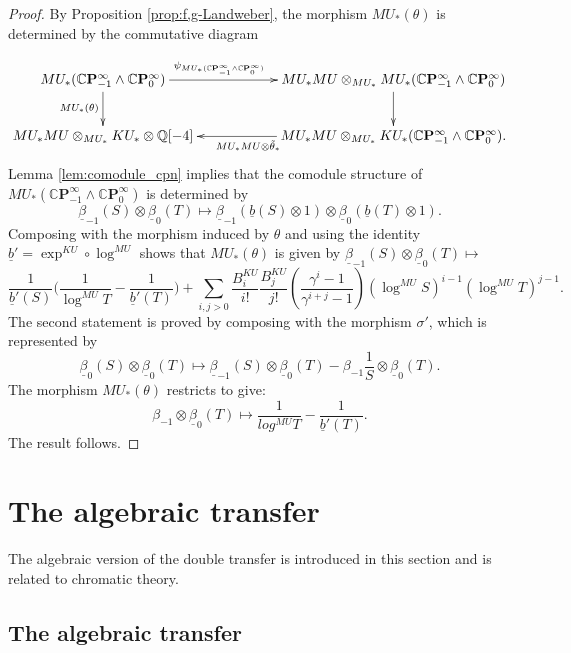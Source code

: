 \documentclass[10pt,a4paper]{amsart}
\theoremstyle{definition}
\theoremstyle{remark}
\newcommand{\rat}{\mathbb{Q}}
\newcommand{\cp}{\mathbb{C} \mathbf{P}^\infty}
\renewcommand{\smash}{\wedge}
\begin{document}
\begin{proof}
 By Proposition \ref{prop:f,g-Landweber}, the morphism $MU_* (\theta)$
is determined by the commutative diagram

\[
\xymatrix{
	MU_* (\cp_{-1} \smash \cp_0)
\ar[rr]^(.4){\psi _{MU_* (\cp_{-1} \smash \cp_0)}}
\ar[d]_{MU_* (\theta)}
&\ &
MU_*MU
\otimes_{MU_*} MU_*(\cp_{-1} \smash \cp_0)
\ar[d]
\\
MU_*MU\otimes_{MU_*} KU_* \otimes \rat [-4]
&&
MU_*MU \otimes _{MU_*} KU_* (\cp_{-1} \smash \cp_0)
\ar[ll]^{MU_*MU \otimes \tilde{\theta}_*}.
}
\]
Lemma \ref{lem:comodule_cpn} implies that the comodule structure of $MU_* (\cp_{-1} \smash \cp_0)$ is determined by
\[
	\underline{\beta}_{-1} (S) \otimes \underline{\beta}_0 (T)
	\mapsto
	\underline{\beta}_{-1} (\underline{b}(S)\otimes 1) \otimes \underline{\beta}_0 (\underline{b}(T) \otimes 1).
\]
Composing with the morphism induced by $\theta$ and using the identity $\underline{b}' = \exp^{KU} \circ \log^{MU}$ shows that $MU_* (\theta)$ is given by
$\underline{\beta}_{-1} (S) \otimes \underline{\beta}_0 (T)
	\mapsto$
\[
\frac{1}{\underline{b}'(S)}
\Big(\frac{1}{\log^{MU} T} - \frac{1}{\underline{b}' (T) }\Big)
+
\sum _{i, j >0}\frac{B_i^{KU}}{i!}\frac{B_j^{KU}}{j!}
\left(
\frac{\gamma^i -1}{\gamma^{i+j}-1}
\right)
(\log^{MU} S)^{i-1}(\log ^{MU} T) ^{j-1}.
\]
The second statement is proved by composing with the  morphism $\sigma'$, which  is represented by
\[
	\underline{\beta}_0 (S) \otimes \underline{\beta}_0 (T) \mapsto \underline{\beta}_{-1} (S) \otimes \underline{\beta}_0 (T) - \beta_{-1} \frac{1}{S}
	\otimes \underline{\beta}_0 (T).
\]
The morphism $MU_* (\theta)$ restricts to give:
\[
	\beta_{-1} \otimes \underline{\beta}_0 (T) \mapsto \frac{1} {log^{MU} T} - \frac{1}{\underline{b}'(T)}.
\]
The result follows.
\end{proof}






%
\section{The algebraic transfer}
\label{sect:cohomtransfer}

The algebraic version of the double transfer is introduced in this section and is related to chromatic theory.



\subsection{The algebraic transfer}
\label{subsect:alg_transfer}
\end{document}
